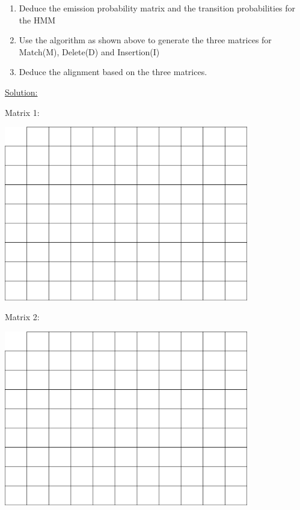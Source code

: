 \documentclass[a4paper,11pt]{article}
\begin{document}
\begin{enumerate}
\item Deduce the emission probability matrix and the transition probabilities for the HMM
\item Use the algorithm as shown above to generate the three matrices for Match(M), Delete(D) and Insertion(I)
\item Deduce the alignment based on the three matrices.
\end{enumerate}

\underline{Solution:}
\newpage

Matrix 1:
\begin{center}
\includegraphics[width=0.8\textwidth]{matrix.png}
\end{center}
\vspace{1.5cm}

Matrix 2:
\begin{center}
\includegraphics[width=0.8\textwidth]{matrix.png}
\end{center}
\vspace{1.5cm}

\newpage 
\end{document}
